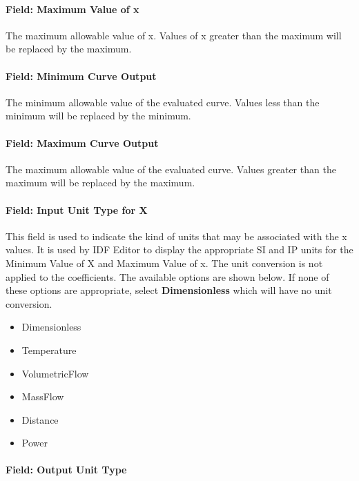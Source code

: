 \paragraph{Field: Maximum Value of x}\label{field-maximum-value-of-x-2}

The maximum allowable value of x. Values of x greater than the maximum will be replaced by the maximum.

\paragraph{Field: Minimum Curve Output}\label{field-minimum-curve-output-1}

The minimum allowable value of the evaluated curve. Values less than the minimum will be replaced by the minimum.

\paragraph{Field: Maximum Curve Output}\label{field-maximum-curve-output-1}

The maximum allowable value of the evaluated curve. Values greater than the maximum will be replaced by the maximum.

\paragraph{Field: Input Unit Type for X}\label{field-input-unit-type-for-x-2}

This field is used to indicate the kind of units that may be associated with the x values. It is used by IDF Editor to display the appropriate SI and IP units for the Minimum Value of X and Maximum Value of x. The unit conversion is not applied to the coefficients. The available options are shown below. If none of these options are appropriate, select \textbf{Dimensionless} which will have no unit conversion.

\begin{itemize}
\item
  Dimensionless
\item
  Temperature
\item
  VolumetricFlow
\item
  MassFlow
\item
  Distance
\item
  Power
\end{itemize}

\paragraph{Field: Output Unit Type}\label{field-output-unit-type-1}

